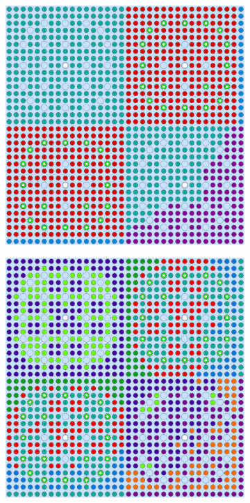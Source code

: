 \begin{figure}[h!]
\begin{subfigure}{0.47\textwidth}
  \includegraphics[width=0.9\linewidth]{figures/unsupervised/geometries/with-features/2-clusters/combined/reflector}
  \caption{}
  \label{fig:chap10-reflector-combined-2}
\end{subfigure}
\begin{subfigure}{0.47\textwidth}
  \centering
  \includegraphics[width=0.9\linewidth]{figures/unsupervised/geometries/with-features/4-clusters/pinch/reflector}

\end{subfigure}
\end{figure}
